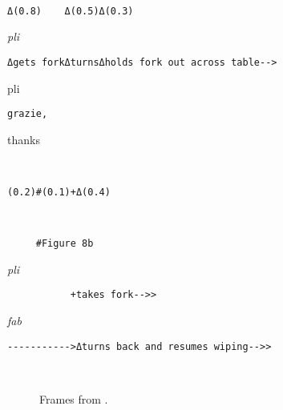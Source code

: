 \documentclass[output=paper,modfonts]{langscibook}
\begin{document}
%
\begin{transbox}{17}{~}
\begin{verbatim}
Δ(0.8)    Δ(0.5)Δ(0.3)    
\end{verbatim}
\end{transbox}
%
\begin{transbox}{18}{\textit{pli}}
\begin{verbatim}
Δgets forkΔturnsΔholds fork out across table-->
\end{verbatim}
\end{transbox}
%
\begin{transbox}{19}{pli}
\begin{verbatim}
grazie,
\end{verbatim}
thanks
\end{transbox}\vspace{2mm}
%
\begin{transbox}{20}{~}
\begin{verbatim}
(0.2)#(0.1)+Δ(0.4)
\end{verbatim}
\end{transbox}
%
\begin{transbox}{21}{~}
\begin{verbatim}
     #Figure 8b
\end{verbatim}
\end{transbox}
%
\begin{transbox}{22}{\textit{pli}}
\begin{verbatim}
           +takes fork-->>
\end{verbatim}
\end{transbox}\vspace{-1.5mm}
%
\begin{transbox}{23}{\textit{fab}}
\begin{verbatim}
----------->Δturns back and resumes wiping-->>
\end{verbatim}
\end{transbox}\bigskip

\begin{figure}
\caption{Frames from .} 
\label{fig:rossi:9}
~~
\end{figure}
\end{document}
